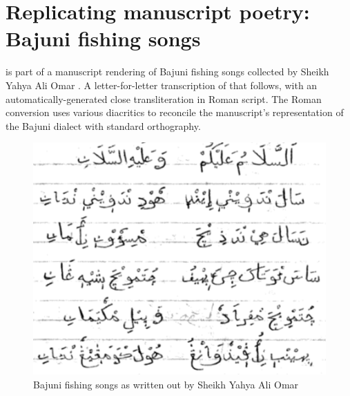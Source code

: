 \begin{quotation}
\end{quotation}

\section{Replicating manuscript poetry: Bajuni fishing songs}
 is part of a manuscript rendering of Bajuni fishing songs collected by Sheikh Yahya Ali Omar \citep{Donnelly1982}.  A letter-for-letter transcription of that follows, with an automatically-generated close transliteration in Roman script.  The Roman conversion uses various diacritics to reconcile the manuscript's representation of the Bajuni dialect with standard orthography.

\begin{figure}[ht]
\centering
\includegraphics[keepaspectratio=true]{./images/fishing-orig.png}
\caption{Bajuni fishing songs as written out by Sheikh Yahya Ali Omar}
\label{fig:fishing}
\end{figure}

